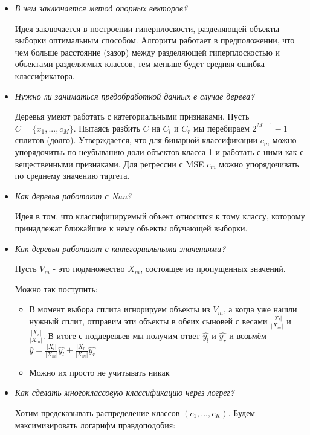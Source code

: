 \documentclass[a4paper]{article}
\begin{document}
\begin{itemize}
\item \textit{В чем заключается метод опорных векторов?}

Идея заключается в построении гиперплоскости, разделяющей объекты выборки оптимальным способом. Алгоритм работает в предположении, что чем больше расстояние (зазор) между разделяющей гиперплоскостью и объектами разделяемых классов, тем меньше будет средняя ошибка классификатора.

\item \textit{Нужно ли заниматься предобработкой данных в случае дерева?}

Деревья умеют работать с категориальными признаками. Пусть $C = \{x_1, ..., c_M\} $. Пытаясь разбить $C$ на $C_l$ и $C_r$ мы перебираем $2^{M-1}-1$ сплитов (долго). Утверждается, что для бинарной классификации $c_m$ можно упорядочитьь по неубыванию доли объектов класса 1 и работать с ними как с вещественными признаками.
Для регрессии с MSE $c_m$ можно упорядочивать по среднему значению таргета.


\item \textit{Как деревья работают с Nan?}

Идея в том, что 
классифицируемый объект относится к тому классу, которому принадлежат ближайшие к нему объекты обучающей выборки.

\item \textit{Как деревья работают с категориальными значениями?}

Пусть $V_m$ - это подмножество $X_m$, состоящее из пропущенных значений.

Можно так поступить:

\begin{itemize}
\item В момент выбора сплита игнорируем объекты из $V_m$, а когда уже нашли нужный сплит, отправим эти объекты в обеих сыновей с весами $\frac{|X_l|}{|X_m|}$ и $\frac{|X_r|}{|X_m|}$. В итоге с поддеревьев мы получим ответ $\hat{y_l}$ и $\hat{y_r}$ и возьмём $\hat{y} = \frac{|X_l|}{|X_m|} \hat{y_l} + \frac{|X_r|}{|X_m|} \hat{y_r}$

\item Можно их просто не учитывать никак
\end{itemize}

\item \textit{ Как сделать многоклассовую классификацию через логрег?}

Хотим предсказывать распределение классов $(c_1, ..., c_K)$. Будем максимизировать логарифм правдоподобия:


\end{itemize}
\end{document}
